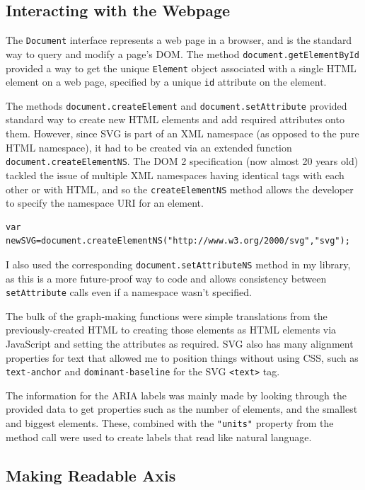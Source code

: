 \documentclass[ %
                    author={Aleena Baig},
                supervisor={Dr Simon Lock},
                    degree={BSc},
                     title={On Making Web Accessible Graphs},
                  subtitle={},
                      year={2019} ]{dissertation}
\begin{document}
\subsection{Interacting with the Webpage}

The \texttt{Document} interface represents a web page in a browser, and is the standard way to query and modify a page's DOM. The method \texttt{document.getElementById} provided a way to get the unique \texttt{Element} object associated with a single HTML element on a web page, specified by a unique \texttt{id} attribute on the element.

The methods \texttt{document.createElement} and \texttt{document.setAttribute} provided standard way to create new HTML elements and add required attributes onto them. However, since SVG is part of an XML namespace (as opposed to the pure HTML namespace), it had to be created via an extended function \texttt{document.createElementNS}. The DOM 2 specification (now almost 20 years old) tackled the issue of multiple XML namespaces having identical tags with each other or with HTML, and so the \texttt{createElementNS} method allows the developer to specify the namespace URI for an element.
\newline
\begin{lstlisting}
var newSVG=document.createElementNS("http://www.w3.org/2000/svg","svg");
\end{lstlisting}

I also used the corresponding \texttt{document.setAttributeNS} method in my library, as this is a more future-proof way to code and allows consistency between \texttt{setAttribute} calls even if a namespace wasn't specified.

The bulk of the graph-making functions were simple translations from the previously-created HTML to creating those elements as HTML elements via JavaScript and setting the attributes as required. SVG also has many alignment properties for text that allowed me to position things without using CSS, such as \texttt{text-anchor} and \texttt{dominant-baseline} for the SVG \texttt{<text>} tag.

The information for the ARIA labels was mainly made by looking through the provided data to get properties such as the number of elements, and the smallest and biggest elements. These, combined with the \texttt{"units"} property from the method call were used to create labels that read like natural language.

\subsection{Making Readable Axis}
\end{document}
